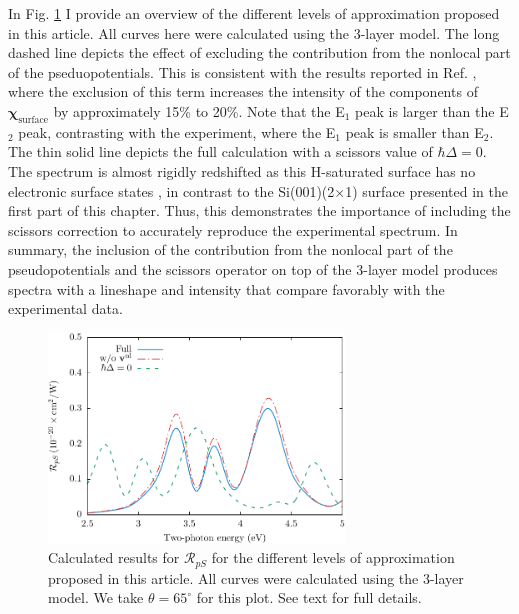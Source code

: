 In Fig. \ref{fig:improvements} I provide an overview of the different levels of
approximation proposed in this article. All curves here were calculated using
the 3-layer model. The long dashed line depicts the effect of excluding the
contribution from the nonlocal part of the pseduopotentials. This is consistent
with the results reported in Ref. \cite{andersonPRB15}, where the exclusion of
this term increases the intensity of the components of
$\boldsymbol{\chi}_{\mathrm{surface}}$ by approximately 15\% to 20\%. Note that
the E$_{1}$ peak is larger than the E$_{2}$ peak, contrasting with the
experiment, where the E$_{1}$ peak is smaller than E$_{2}$. The thin solid line
depicts the full calculation with a scissors value of $\hbar\Delta = 0$. The
spectrum is almost rigidly redshifted as this H-saturated surface has no
electronic surface states \cite{andersonPRB15}, in contrast to the
Si(001)(2$\times$1) surface presented in the first part of this chapter. Thus,
this demonstrates the importance of including the scissors correction to
accurately reproduce the experimental spectrum. In summary, the inclusion of the
contribution from the nonlocal part of the pseudopotentials and the scissors
operator on top of the 3-layer model produces spectra with a lineshape and
intensity that compare favorably with the experimental data.

\begin{figure}[t]
\centering
\includegraphics[width=0.7\textwidth]
{content/figures/fig-Si1x1-Mejia_RpS_improvements}
\caption{Calculated results for $\mathcal{R}_{pS}$ for the different levels of
approximation proposed in this article. All curves were calculated using the
3-layer model. We take $\theta=65^{\circ}$ for this plot. See text for full
details.}
\label{fig:improvements}
\end{figure}

